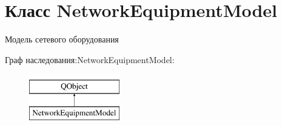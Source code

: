 \hypertarget{class_network_equipment_model}{}\section{Класс Network\+Equipment\+Model}
\label{class_network_equipment_model}


Модель сетевого оборудования  


Граф наследования\+:Network\+Equipment\+Model\+:\begin{figure}[H]
\begin{center}
\leavevmode
\includegraphics[height=2.000000cm]{class_network_equipment_model}
\end{center}
\end{figure}
